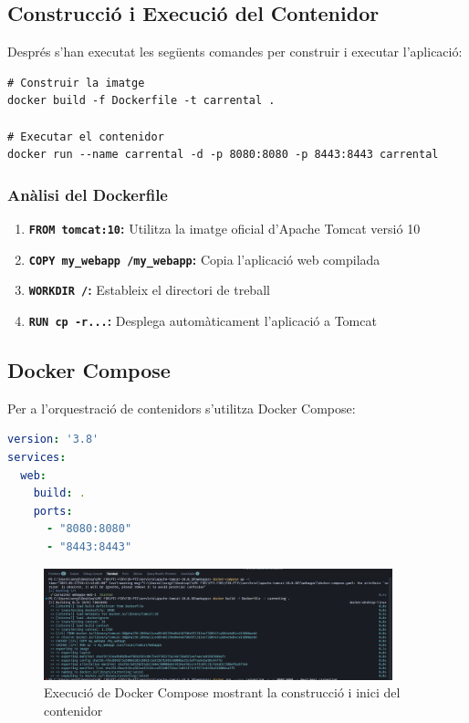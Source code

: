 \documentclass[12pt,a4paper]{article}
\begin{document}
\subsection{Construcció i Execució del Contenidor}

Després s'han executat les següents comandes per construir i executar l'aplicació:

\begin{lstlisting}[style=shellstyle,caption=Comandaments de construcció i execució]
# Construir la imatge
docker build -f Dockerfile -t carrental .

# Executar el contenidor
docker run --name carrental -d -p 8080:8080 -p 8443:8443 carrental
\end{lstlisting}

\subsubsection{Anàlisi del Dockerfile}

\begin{enumerate}
    \item \textbf{\texttt{FROM tomcat:10}:} Utilitza la imatge oficial d'Apache Tomcat versió 10
    \item \textbf{\texttt{COPY my\_webapp /my\_webapp}:} Copia l'aplicació web compilada
    \item \textbf{\texttt{WORKDIR /}:} Estableix el directori de treball
    \item \textbf{\texttt{RUN cp -r...}:} Desplega automàticament l'aplicació a Tomcat
\end{enumerate}

\subsection{Docker Compose}

Per a l'orquestració de contenidors s'utilitza Docker Compose:

\begin{lstlisting}[language=YAML,caption=Configuració Docker Compose]
version: '3.8'
services:
  web:
    build: .
    ports:
      - "8080:8080"
      - "8443:8443"
\end{lstlisting}

\begin{figure}[H]
\centering
\includegraphics[width=0.9\textwidth]{img/docker_compose.png}
\caption{Execució de Docker Compose mostrant la construcció i inici del contenidor}
\end{figure}
\end{document}

